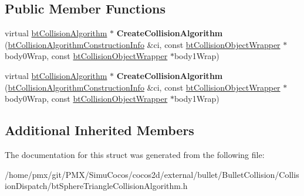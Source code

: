 \subsection*{Public Member Functions}
\begin{DoxyCompactItemize}
\item 
\mbox{\label{structbtSphereTriangleCollisionAlgorithm_1_1CreateFunc_a2e923d86c88767f081b3a6ac7ad22d14}} 
virtual \hyperlink{classbtCollisionAlgorithm}{bt\+Collision\+Algorithm} $\ast$ {\bfseries Create\+Collision\+Algorithm} (\hyperlink{structbtCollisionAlgorithmConstructionInfo}{bt\+Collision\+Algorithm\+Construction\+Info} \&ci, const \hyperlink{structbtCollisionObjectWrapper}{bt\+Collision\+Object\+Wrapper} $\ast$body0\+Wrap, const \hyperlink{structbtCollisionObjectWrapper}{bt\+Collision\+Object\+Wrapper} $\ast$body1\+Wrap)
\item 
\mbox{\label{structbtSphereTriangleCollisionAlgorithm_1_1CreateFunc_a2e923d86c88767f081b3a6ac7ad22d14}} 
virtual \hyperlink{classbtCollisionAlgorithm}{bt\+Collision\+Algorithm} $\ast$ {\bfseries Create\+Collision\+Algorithm} (\hyperlink{structbtCollisionAlgorithmConstructionInfo}{bt\+Collision\+Algorithm\+Construction\+Info} \&ci, const \hyperlink{structbtCollisionObjectWrapper}{bt\+Collision\+Object\+Wrapper} $\ast$body0\+Wrap, const \hyperlink{structbtCollisionObjectWrapper}{bt\+Collision\+Object\+Wrapper} $\ast$body1\+Wrap)
\end{DoxyCompactItemize}
\subsection*{Additional Inherited Members}


The documentation for this struct was generated from the following file\+:\begin{DoxyCompactItemize}
\item 
/home/pmx/git/\+P\+M\+X/\+Simu\+Cocos/cocos2d/external/bullet/\+Bullet\+Collision/\+Collision\+Dispatch/bt\+Sphere\+Triangle\+Collision\+Algorithm.\+h\end{DoxyCompactItemize}

